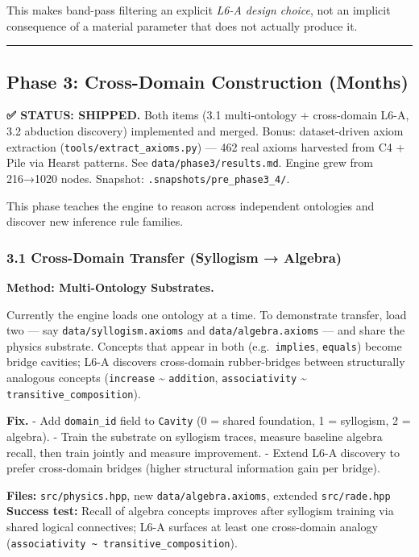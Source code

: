 \documentclass[
  11pt,
  a4paper,
]{article}
\begin{document}
This makes band-pass filtering an explicit \emph{L6-A design choice},
not an implicit consequence of a material parameter that does not
actually produce it.

\begin{center}\rule{0.5\linewidth}{0.5pt}\end{center}

\subsection{Phase 3: Cross-Domain Construction
(Months)}\label{phase-3-cross-domain-construction-months}

\textbf{✅ STATUS: SHIPPED.} Both items (3.1 multi-ontology +
cross-domain L6-A, 3.2 abduction discovery) implemented and merged.
Bonus: dataset-driven axiom extraction
(\texttt{tools/extract\_axioms.py}) --- 462 real axioms harvested from
C4 + Pile via Hearst patterns. See \texttt{data/phase3/results.md}.
Engine grew from 216→1020 nodes. Snapshot:
\texttt{.snapshots/pre\_phase3\_4/}.

This phase teaches the engine to reason across independent ontologies
and discover new inference rule families.

\subsubsection{3.1 Cross-Domain Transfer (Syllogism →
Algebra)}\label{cross-domain-transfer-syllogism-algebra}

\textbf{Method: Multi-Ontology Substrates.}

Currently the engine loads one ontology at a time. To demonstrate
transfer, load two --- say \texttt{data/syllogism.axioms} and
\texttt{data/algebra.axioms} --- and share the physics substrate.
Concepts that appear in both (e.g.~\texttt{implies}, \texttt{equals})
become bridge cavities; L6-A discovers cross-domain rubber-bridges
between structurally analogous concepts (\texttt{increase}
\textasciitilde{} \texttt{addition}, \texttt{associativity}
\textasciitilde{} \texttt{transitive\_composition}).

\textbf{Fix.} - Add \texttt{domain\_id} field to \texttt{Cavity} (0 =
shared foundation, 1 = syllogism, 2 = algebra). - Train the substrate on
syllogism traces, measure baseline algebra recall, then train jointly
and measure improvement. - Extend L6-A discovery to prefer cross-domain
bridges (higher structural information gain per bridge).

\textbf{Files:} \texttt{src/physics.hpp}, new
\texttt{data/algebra.axioms}, extended \texttt{src/rade.hpp}
\textbf{Success test:} Recall of algebra concepts improves after
syllogism training via shared logical connectives; L6-A surfaces at
least one cross-domain analogy
(\texttt{associativity\ \textasciitilde{}\ transitive\_composition}).
\end{document}
